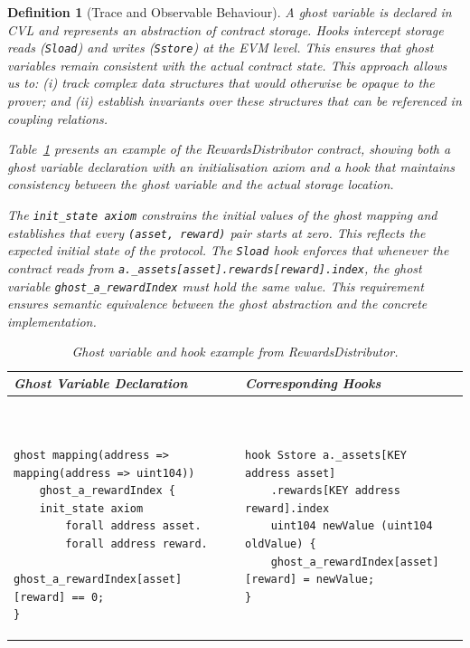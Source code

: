 \documentclass[manuscript,screen,review]{acmart}
\newtheorem{definition}{Definition}
\begin{document}
\begin{definition}[Trace and Observable Behaviour]
A ghost variable is declared in CVL and represents an abstraction of contract storage. Hooks intercept storage reads (\texttt{Sload}) and writes (\texttt{Sstore}) at the EVM level. This ensures that ghost variables remain consistent with the actual contract state. This approach allows us to: (i) track complex data structures that would otherwise be opaque to the prover; and (ii) establish invariants over these structures that can be referenced in coupling relations.

Table~\ref{lst:ghost_variables} presents an example of the RewardsDistributor contract, showing both a ghost variable declaration with an initialisation axiom and a hook that maintains consistency between the ghost variable and the actual storage location.

The \texttt{init\_state axiom} constrains the initial values of the ghost mapping and establishes that every \texttt{(asset, reward)} pair starts at zero. This reflects the expected initial state of the protocol. The \texttt{Sload} hook enforces that whenever the contract reads from \texttt{a.\_assets[asset].rewards[reward].index}, the ghost variable \texttt{ghost\_a\_rewardIndex} must hold the same value. This requirement ensures semantic equivalence between the ghost abstraction and the concrete implementation.

\begin{table}[htb]
\caption{Ghost variable and hook example from RewardsDistributor.}
\label{lst:ghost_variables}
\centering
\begin{tabular}{|p{}|p{}|}
\hline
\rowcolor[HTML]{EFEFEF}
\textbf{Ghost Variable Declaration} & \textbf{Corresponding Hooks} \\ \hline
\vspace*{-0.4cm}
\begin{verbatim}


ghost mapping(address => mapping(address => uint104)) 
    ghost_a_rewardIndex {
    init_state axiom 
        forall address asset. 
        forall address reward.
            ghost_a_rewardIndex[asset][reward] == 0;
}
\end{verbatim}
&
\vspace*{-0.4cm}
\begin{verbatim}


hook Sstore a._assets[KEY address asset]
    .rewards[KEY address reward].index 
    uint104 newValue (uint104 oldValue) {
    ghost_a_rewardIndex[asset][reward] = newValue;
}


\end{verbatim}
\end{tabular}
\end{table}
\end{definition}
\end{document}
